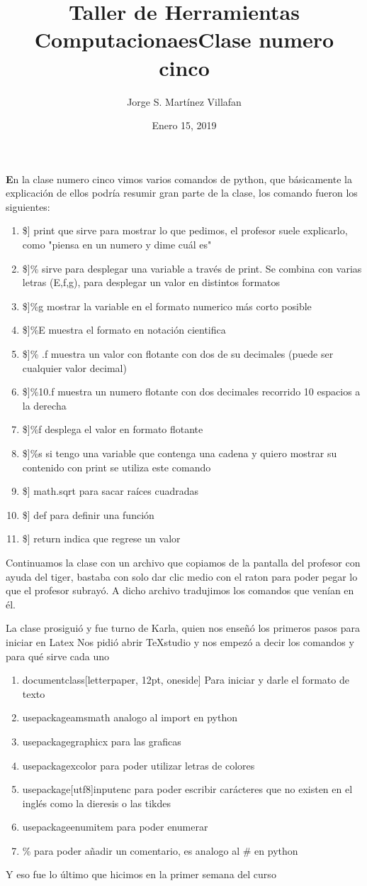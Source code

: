 \documentclass[letterpaper, 12pt, oneside]{article}%
\title{\Huge Taller de Herramientas Computacionaes}
\author{Jorge S. Martínez Villafan}
\date{Enero 15, 2019}
\begin{document}
\maketitle
\newpage
\title{Clase numero cinco}

\textbf En la clase numero cinco vimos varios comandos de python, que básicamente la explicación de ellos podría resumir gran parte de la clase, los comando fueron los siguientes:
\begin{enumerate}
	\item \$] print que sirve para mostrar lo que pedimos, el profesor suele explicarlo, como "piensa en un numero y dime cuál es"
	\item \$]\% sirve para desplegar una variable a través de print. Se combina con varias letras (E,f,g), para desplegar un valor en distintos formatos
	\item \$]\%g mostrar la variable en el formato numerico más corto posible
	\item \$]\%E muestra el formato en notación cientifica
	\item \$]\% .f muestra un valor con flotante con dos de su decimales (puede ser cualquier valor decimal)
	\item \$]\%10.f muestra un numero flotante con dos decimales recorrido 10 espacios a la derecha
	\item \$]\%f desplega el valor en formato flotante
	\item \$]\%s si tengo una variable que contenga una cadena y quiero mostrar su contenido con print se utiliza este comando
	\item \$] math.sqrt para sacar raíces cuadradas
	\item \$] def para definir una función
	\item \$] return indica que regrese un valor
\end{enumerate}
Continuamos la clase con un archivo que copiamos de la pantalla del profesor con ayuda del tiger, bastaba con solo dar clic medio con el raton para poder pegar lo que el profesor subrayó. A dicho archivo tradujimos los comandos que venían en él.


La clase prosiguió y fue turno de Karla, quien nos enseñó los primeros pasos para iniciar en Latex
Nos pidió abrir TeXstudio
y nos empezó a decir los comandos y para qué sirve cada uno
\begin{enumerate}
    \item documentclass[letterpaper, 12pt, oneside] Para iniciar y darle el formato de texto
	\item usepackage{amsmath} analogo al import en python
	\item usepackage{graphicx} para las graficas 
	\item usepackage{xcolor} para poder utilizar letras de colores
	\item usepackage[utf8]{inputenc} para poder escribir carácteres que no existen en el inglés como la dieresis o las tikdes
	\item usepackage{enumitem} para poder enumerar 
	\item \% para poder añadir un comentario, es analogo al \# en python
\end{enumerate}
Y eso fue lo último que hicimos en la primer semana del curso
\end{document}
